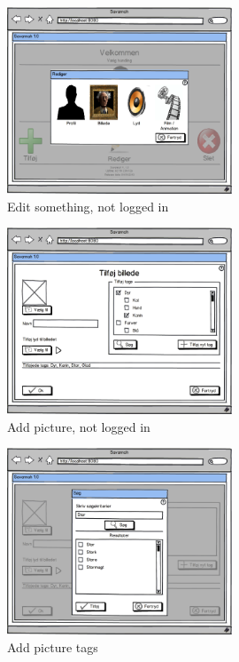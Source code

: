 \begin{figure}[H]
	\centering
		\includegraphics[width=0.60\textwidth]{images/Mocks/03-EditStuff.png}
	\caption{Edit something, not logged in}
	\label{fig:03-EditStuff}
\end{figure}

\begin{figure}[H]
	\centering
		\includegraphics[width=0.60\textwidth]{images/Mocks/011-AddPicture.png}
	\caption{Add picture, not logged in}
	\label{fig:011-AddPicture}
\end{figure}

\begin{figure}[H]
	\centering
		\includegraphics[width=0.60\textwidth]{images/Mocks/0111-AddPictureTags.png}
	\caption{Add picture tags}
	\label{fig:0111-AddPictureTags}
\end{figure}

